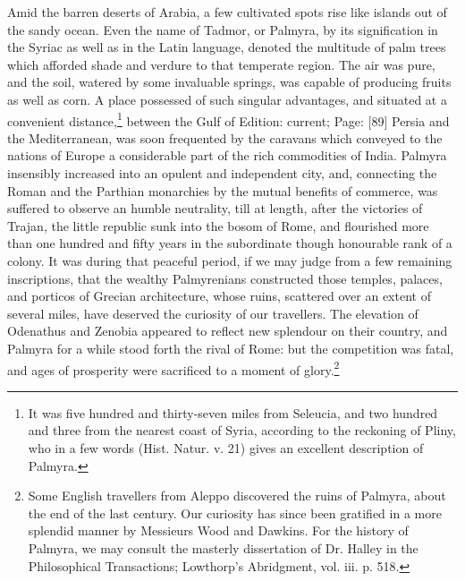 Amid the barren deserts of Arabia, a few cultivated spots rise like islands out of the sandy ocean. Even the name of Tadmor, or Palmyra, by its signification in the Syriac as well as in the Latin language, denoted the multitude of palm trees which afforded shade and verdure to that temperate region. The air was pure, and the soil, watered by some invaluable springs, was capable of producing fruits as well as corn. A place possessed of such singular advantages, and situated at a convenient distance,\footnote{It was five hundred and thirty-seven miles from Seleucia, and two hundred and three from the nearest coast of Syria, according to the reckoning of Pliny, who in a few words (Hist. Natur. v. 21) gives an excellent description of Palmyra.} between the Gulf of Edition: current; Page: [89] Persia and the Mediterranean, was soon frequented by the caravans which conveyed to the nations of Europe a considerable part of the rich commodities of India. Palmyra insensibly increased into an opulent and independent city, and, connecting the Roman and the Parthian monarchies by the mutual benefits of commerce, was suffered to observe an humble neutrality, till at length, after the victories of Trajan, the little republic sunk into the bosom of Rome, and flourished more than one hundred and fifty years in the subordinate though honourable rank of a colony. It was during that peaceful period, if we may judge from a few remaining inscriptions, that the wealthy Palmyrenians constructed those temples, palaces, and porticos of Grecian architecture, whose ruins, scattered over an extent of several miles, have deserved the curiosity of our travellers. The elevation of Odenathus and Zenobia appeared to reflect new splendour on their country, and Palmyra for a while stood forth the rival of Rome: but the competition was fatal, and ages of prosperity were sacrificed to a moment of glory.\footnote{Some English travellers from Aleppo discovered the ruins of Palmyra, about the end of the last century. Our curiosity has since been gratified in a more splendid manner by Messieurs Wood and Dawkins. For the history of Palmyra, we may consult the masterly dissertation of Dr. Halley in the Philosophical Transactions; Lowthorp\texthebrew{}’s Abridgment, vol. iii. p. 518.}

